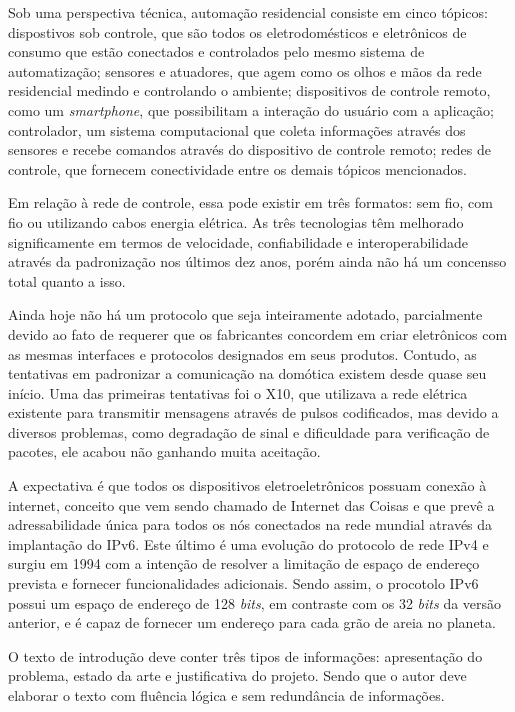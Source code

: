\documentclass[
    12pt,               %
    a4paper,            %
    english,            %
    brazil,             %
    ]{article}
\begin{document}
Sob uma perspectiva técnica, automação residencial consiste em cinco tópicos: dispostivos sob controle, que são todos os eletrodomésticos e eletrônicos de consumo que estão conectados e controlados
pelo mesmo sistema de automatização; sensores e atuadores, que agem como os olhos e mãos da rede residencial medindo e controlando o ambiente; dispositivos de controle remoto, como um \textit{smartphone},
que possibilitam a interação do usuário com a aplicação; controlador, um sistema computacional que coleta informações através dos sensores e recebe comandos através do dispositivo de controle remoto; redes
de controle, que fornecem conectividade entre os demais tópicos mencionados. \cite{kyas2013}

Em relação à rede de controle, essa pode existir em três formatos: sem fio, com fio ou utilizando cabos energia elétrica. As três tecnologias têm melhorado significamente em termos de velocidade,
confiabilidade e interoperabilidade através da padronização nos últimos dez anos, porém ainda não há um concensso total quanto a isso. \cite{kyas2013}

Ainda hoje não há um protocolo que seja inteiramente adotado, parcialmente devido ao fato de requerer que os fabricantes concordem em criar eletrônicos com as
mesmas interfaces e protocolos designados em seus produtos. Contudo, as tentativas em padronizar a comunicação na domótica existem desde quase seu início. Uma das primeiras tentativas foi o X10, que
utilizava a rede elétrica existente para transmitir mensagens através de pulsos codificados, mas devido a diversos problemas, como degradação de sinal e dificuldade para verificação de pacotes, ele acabou
não ganhando muita aceitação. \cite{riley2012}

A expectativa é que todos os dispositivos eletroeletrônicos possuam conexão à internet, conceito que vem sendo chamado de  Internet das Coisas e que prevê a adressabilidade única para todos os
nós conectados na rede mundial através da implantação do IPv6. Este último é uma evolução do protocolo de rede IPv4 e surgiu em 1994 com a intenção de resolver a limitação de espaço de endereço prevista e fornecer
funcionalidades adicionais. Sendo assim, o procotolo IPv6 possui um espaço de endereço de 128 \textit{bits}, em contraste com os 32 \textit{bits} da versão anterior, e é capaz de fornecer um endereço
para cada grão de areia no planeta. \cite{hagen2002}



O texto de introdução deve conter três tipos de informações: apresentação do problema, estado da arte e justificativa do projeto.  Sendo que o autor deve elaborar
o texto com fluência lógica e sem redundância de informações.
\end{document}
